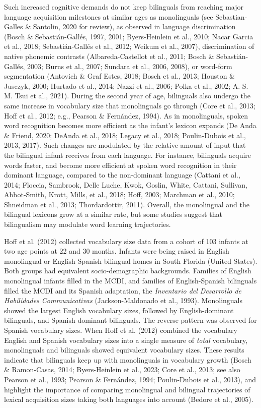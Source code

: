 \documentclass[
  12pt,
  b5paperpaper,
  twoside]{scrreprt}
\begin{document}
Such increased cognitive demands do not keep bilinguals from reaching
major language acquisition milestones at similar ages as monolinguals
(see Sebastian-Galles \& Santolin, 2020 for review), as observed in
language discrimination (Bosch \& Sebastián-Gallés, 1997, 2001;
Byers-Heinlein et al., 2010; Nacar Garcia et al., 2018; Sebastián-Gallés
et al., 2012; Weikum et al., 2007), discrimination of native phonemic
contrasts (Albareda-Castellot et al., 2011; Bosch \& Sebastián-Gallés,
2003; Burns et al., 2007; Sundara et al., 2006, 2008), or word-form
segmentation (Antovich \& Graf Estes, 2018; Bosch et al., 2013; Houston
\& Jusczyk, 2000; Hurtado et al., 2014; Nazzi et al., 2006; Polka et
al., 2002; A. S. M. Tsui et al., 2021). During the second year of age,
bilinguals also undergo the same increase in vocabulary size that
monolinguals go through (Core et al., 2013; Hoff et al., 2012; e.g.,
Pearson \& Fernández, 1994). As in monolinguals, spoken word recognition
becomes more efficient as the infant's lexicon expands (De Anda \&
Friend, 2020; DeAnda et al., 2018; Legacy et al., 2018; Poulin-Dubois et
al., 2013, 2017). Such changes are modulated by the relative amount of
input that the bilingual infant receives from each language. For
instance, bilinguals acquire words faster, and become more efficient at
spoken word recognition in their dominant language, compared to the
non-dominant language (Cattani et al., 2014; Floccia, Sambrook, Delle
Luche, Kwok, Goslin, White, Cattani, Sullivan, Abbot-Smith, Krott,
Mills, et al., 2018; Hoff, 2003; Marchman et al., 2010; Shneidman et
al., 2013; Thordardottir, 2011). Overall, the monolingual and the
bilingual lexicons grow at a similar rate, but some studies suggest that
bilingualism may modulate word learning trajectories.

Hoff et al. (2012) collected vocabulary size data from a cohort of 103
infants at two age points at 22 and 30 months. Infants were being raised
in English monolingual or English-Spanish bilingual homes in South
Florida (United States). Both groups had equivalent socio-demographic
backgrounds. Families of English monolingual infants filled in the MCDI,
and families of English-Spanish bilinguals filled the MCDI and its
Spanish adaptation, the \emph{Inventario del Desarrollo de Habilidades
Communicativas} (Jackson-Maldonado et al., 1993). Monolinguals showed
the largest English vocabulary sizes, followed by English-dominant
bilinguals, and Spanish-dominant bilinguals. The reverse pattern was
observed for Spanish vocabulary sizes. When Hoff et al. (2012) combined
the vocabulary English and Spanish vocabulary sizes into a single
measure of \emph{total} vocabulary, monolinguals and bilinguals showed
equivalent vocabulary sizes. These results indicate that bilinguals keep
up with monolinguals in vocabulary growth (Bosch \& Ramon-Casas, 2014;
Byers-Heinlein et al., 2023; Core et al., 2013; see also Pearson et al.,
1993; Pearson \& Fernández, 1994; Poulin-Dubois et al., 2013), and
highlight the importance of comparing monolingual and bilingual
trajectories of lexical acquisition sizes taking both languages into
account (Bedore et al., 2005).
\end{document}
